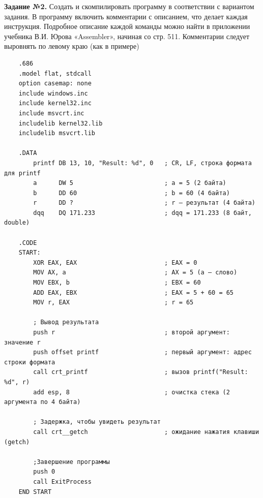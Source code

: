     \textbf{Задание №2.} Создать и скомпилировать программу в соответствии с вариантом задания. В программу включить комментарии с описанием, что делает каждая инструкция. Подробное описание каждой команды можно найти в приложении учебника В.И. Юрова «Assembler», начиная со стр. 511. Комментарии следует выровнять по левому краю (как в примере)\label{sec:2}

    \begin{verbatim}
    .686
    .model flat, stdcall
    option casemap: none
    include windows.inc
    include kernel32.inc
    include msvcrt.inc
    includelib kernel32.lib
    includelib msvcrt.lib
    
    .DATA
        printf DB 13, 10, "Result: %d", 0   ; CR, LF, строка формата для printf
        a      DW 5                         ; a = 5 (2 байта)
        b      DD 60                        ; b = 60 (4 байта)
        r      DD ?                         ; r — результат (4 байта)
        dqq    DQ 171.233                   ; dqq = 171.233 (8 байт, double)
    
    .CODE
    START:
        XOR EAX, EAX                        ; EAX = 0
        MOV AX, a                           ; AX = 5 (a — слово)
        MOV EBX, b                          ; EBX = 60
        ADD EAX, EBX                        ; EAX = 5 + 60 = 65
        MOV r, EAX                          ; r = 65
    
        ; Вывод результата
        push r                              ; второй аргумент: значение r
        push offset printf                  ; первый аргумент: адрес строки формата
        call crt_printf                     ; вызов printf("Result: %d", r)
        add esp, 8                          ; очистка стека (2 аргумента по 4 байта)
    
        ; Задержка, чтобы увидеть результат
        call crt__getch                     ; ожидание нажатия клавиши (getch)
    
        ;Завершение программы 
        push 0
        call ExitProcess
    END START
    \end{verbatim}